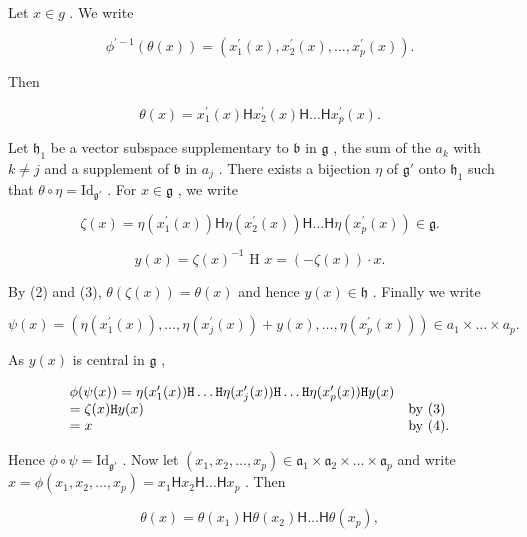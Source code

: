 Let \(x \in g\) . We write

\[
\phi^ {\prime - 1} (\theta (x)) = \left(x _ {1} ^ {\prime} (x), x _ {2} ^ {\prime} (x), \dots , x _ {p} ^ {\prime} (x)\right).\tag{1}
\]

Then

\[
\theta (x) = x _ {1} ^ {\prime} (x) \mathsf {H} x _ {2} ^ {\prime} (x) \mathsf {H} \dots \mathsf {H} x _ {p} ^ {\prime} (x).\tag{2}
\]

Let \(\mathfrak{h}_1\) be a vector subspace supplementary to \(\mathfrak{b}\) in \(\mathfrak{g}\) , the sum of the \(a_k\) with \(k \neq j\) and a supplement of \(\mathfrak{b}\) in \(a_j\) . There exists a bijection \(\eta\) of \(\mathfrak{g}'\) onto \(\mathfrak{h}_1\) such that \(\theta \circ \eta = \mathrm{Id}_{\mathfrak{g}'}\) . For \(x \in \mathfrak{g}\) , we write

\[
\zeta (x) = \eta (x _ {1} ^ {\prime} (x)) \mathsf {H} \eta (x _ {2} ^ {\prime} (x)) \mathsf {H} \dots \mathsf {H} \eta (x _ {p} ^ {\prime} (x)) \in \mathfrak {g}.\tag{3}
\]

\[
y (x) = \zeta (x) ^ {- 1} \text { H } x = (- \zeta (x))\cdot x.\tag{4}
\]

By (2) and (3), \(\theta (\zeta (x)) = \theta (x)\) and hence \(y(x)\in \mathfrak{h}\) . Finally we write

\[
\psi (x) = \left(\eta \left(x _ {1} ^ {\prime} (x)\right), \dots , \eta \left(x _ {j} ^ {\prime} (x)\right) + y (x), \dots , \eta \left(x _ {p} ^ {\prime} (x)\right)\right) \in a _ {1} \times \dots \times a _ {p}.\tag{5}
\]

As \(y(x)\) is central in \(\mathfrak{g}\) ,

\[
\begin{array}{l l} \phi (\psi (x)) = \eta (x _ {1} ^ {\prime} (x)) \texttt {H} \dots \texttt {H} \eta (x _ {j} ^ {\prime} (x)) \texttt {H} \dots \texttt {H} \eta (x _ {p} ^ {\prime} (x)) \texttt {H} y (x) \\ = \zeta (x) \texttt {H} y (x) & \text {by (3)} \\ = x & \text {by (4)}. \end{array}
\]

Hence \(\phi \circ \psi = \mathrm{Id}_{\mathfrak{g}'}\) . Now let \((x_{1}, x_{2}, \ldots, x_{p}) \in \mathfrak{a}_{1} \times \mathfrak{a}_{2} \times \dots \times \mathfrak{a}_{p}\) and write \(x = \phi(x_{1}, x_{2}, \ldots, x_{p}) = x_{1} \mathsf{H} x_{2} \mathsf{H} \dots \mathsf{H} x_{p}\) . Then

\[
\theta (x) = \theta (x _ {1}) \mathsf {H} \theta (x _ {2}) \mathsf {H} \dots \mathsf {H} \theta (x _ {p}),
\]

